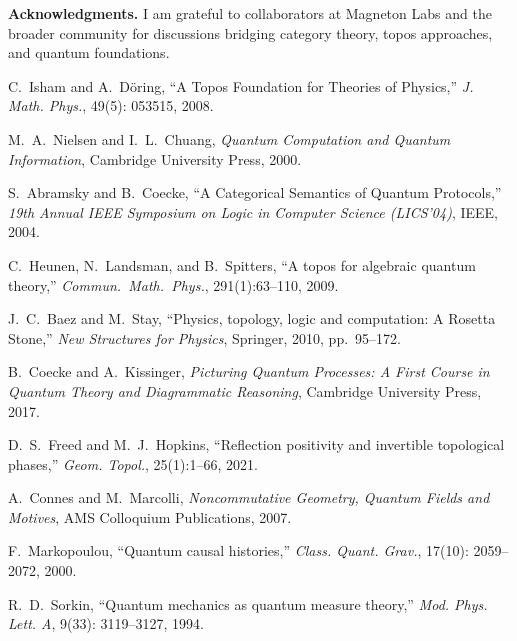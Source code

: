 \documentclass[12pt]{article}
\begin{document}
\vspace{0.5cm}
\noindent \textbf{Acknowledgments.} 
I am grateful to collaborators at Magneton Labs and the broader
community for discussions bridging category theory, topos approaches,
and quantum foundations.

\begin{thebibliography}{99}
C.~Isham and A.~D\"oring, ``A Topos Foundation for Theories of Physics,''
\emph{J. Math. Phys.}, 49(5): 053515, 2008.

M.~A.~Nielsen and I.~L.~Chuang,
\textit{Quantum Computation and Quantum Information}, 
Cambridge University Press, 2000.

S.~Abramsky and B.~Coecke, 
``A Categorical Semantics of Quantum Protocols,''
\emph{19th Annual IEEE Symposium on Logic in Computer Science (LICS'04)},
IEEE, 2004.

C.~Heunen, N.~Landsman, and B.~Spitters, 
``A topos for algebraic quantum theory,''
\emph{Commun.\ Math.\ Phys.}, 291(1):63--110, 2009.

J.~C.~Baez and M.~Stay,
``Physics, topology, logic and computation: A Rosetta Stone,''
\emph{New Structures for Physics}, Springer, 2010, pp.~95--172.

B.~Coecke and A.~Kissinger,
\textit{Picturing Quantum Processes: A First Course in Quantum Theory and Diagrammatic Reasoning},
Cambridge University Press, 2017.

D.~S.~Freed and M.~J.~Hopkins,
``Reflection positivity and invertible topological phases,''
\emph{Geom. Topol.}, 25(1):1--66, 2021.

A.~Connes and M.~Marcolli,
\textit{Noncommutative Geometry, Quantum Fields and Motives},
AMS Colloquium Publications, 2007.

F.~Markopoulou,
``Quantum causal histories,''
\emph{Class. Quant. Grav.}, 17(10): 2059--2072, 2000.

R.~D.~Sorkin,
``Quantum mechanics as quantum measure theory,''
\emph{Mod. Phys. Lett. A}, 9(33): 3119--3127, 1994.

\end{thebibliography}
\end{document}
